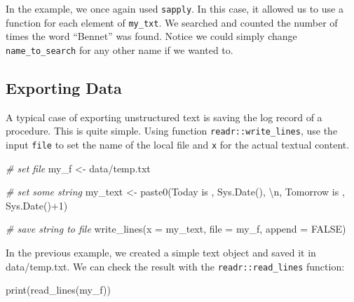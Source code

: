 \documentclass[
  12pt,
]{book}
\newenvironment{Shaded}{\begin{snugshade}}{\end{snugshade}}
\newcommand{\AttributeTok}[1]{\textcolor[rgb]{0.61,0.61,0.61}{#1}}
\newcommand{\CommentTok}[1]{\textcolor[rgb]{0.37,0.37,0.37}{\textit{#1}}}
\newcommand{\ConstantTok}[1]{\textcolor[rgb]{0,0,0}{#1}}
\newcommand{\DecValTok}[1]{\textcolor[rgb]{0.06,0.06,0.06}{#1}}
\newcommand{\FunctionTok}[1]{\textcolor[rgb]{0,0,0}{#1}}
\newcommand{\NormalTok}[1]{#1}
\newcommand{\OtherTok}[1]{\textcolor[rgb]{0.37,0.37,0.37}{#1}}
\newcommand{\SpecialCharTok}[1]{\textcolor[rgb]{0,0,0}{#1}}
\newcommand{\StringTok}[1]{\textcolor[rgb]{0.5,0.5,0.5}{#1}}
\begin{document}
In the example, we once again used \texttt{sapply}. In this case, it allowed us to use a function for each element of \texttt{my\_txt}. We searched and counted the number of times the word ``Bennet'' was found. Notice we could simply change \texttt{name\_to\_search} for any other name if we wanted to.

\hypertarget{exporting-data-5}{%
\subsection{Exporting Data}\label{exporting-data-5}}

A typical case of exporting unstructured text is saving the log record of a procedure. This is quite simple. Using function \texttt{readr::write\_lines}, use the input \texttt{file} to set the name of the local file and \texttt{x} for the actual textual content. 

\begin{Shaded}
\begin{Highlighting}[]
\CommentTok{\# set file}
\NormalTok{my\_f }\OtherTok{\textless{}{-}} \StringTok{\textquotesingle{}data/temp.txt\textquotesingle{}}

\CommentTok{\# set some string}
\NormalTok{my\_text }\OtherTok{\textless{}{-}} \FunctionTok{paste0}\NormalTok{(}\StringTok{\textquotesingle{}Today is \textquotesingle{}}\NormalTok{, }\FunctionTok{Sys.Date}\NormalTok{(), }\StringTok{\textquotesingle{}}\SpecialCharTok{\textbackslash{}n}\StringTok{\textquotesingle{}}\NormalTok{, }
                  \StringTok{\textquotesingle{}Tomorrow is \textquotesingle{}}\NormalTok{, }\FunctionTok{Sys.Date}\NormalTok{()}\SpecialCharTok{+}\DecValTok{1}\NormalTok{)}

\CommentTok{\# save string to file}
\FunctionTok{write\_lines}\NormalTok{(}\AttributeTok{x =}\NormalTok{ my\_text, }\AttributeTok{file =}\NormalTok{ my\_f, }\AttributeTok{append =} \ConstantTok{FALSE}\NormalTok{)}
\end{Highlighting}
\end{Shaded}

In the previous example, we created a simple text object and saved it in data/temp.txt. We can check the result with the \texttt{readr::read\_lines} function:

\begin{Shaded}
\begin{Highlighting}[]
\FunctionTok{print}\NormalTok{(}\FunctionTok{read\_lines}\NormalTok{(my\_f))}
\end{Highlighting}
\end{Shaded}
\end{document}
